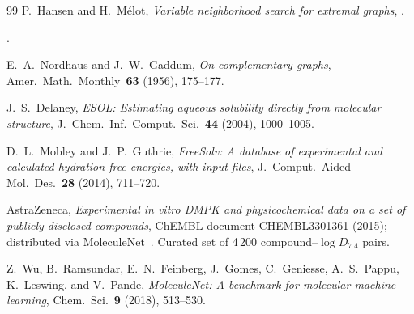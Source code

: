 \documentclass[11pt,a4paper]{article}
\theoremstyle{definition}
\newcommand{\todo}[1]{}
\begin{document}
\begin{thebibliography}{99}
P.~Hansen and H.~M\'elot,
\emph{Variable neighborhood search for extremal graphs},
\todo{[FULL CITATION REFERENCE NEEDED]}.

\todo{[BICYCLIC EXTREMAL REFERENCE NEEDED]}.

E.~A.~Nordhaus and J.~W.~Gaddum,
\emph{On complementary graphs},
Amer.~Math.~Monthly~\textbf{63} (1956), 175--177.

J.~S.~Delaney,
\emph{ESOL: Estimating aqueous solubility directly from molecular structure},
J.~Chem.~Inf.~Comput.~Sci.~\textbf{44} (2004), 1000--1005.

D.~L.~Mobley and J.~P.~Guthrie,
\emph{FreeSolv: A database of experimental and calculated hydration
free energies, with input files},
J.~Comput.~Aided Mol.~Des.~\textbf{28} (2014), 711--720.

AstraZeneca, \emph{Experimental in vitro DMPK and physicochemical data
on a set of publicly disclosed compounds},
ChEMBL document CHEMBL3301361 (2015);
distributed via MoleculeNet~\cite{MoleculeNet}. Curated set of
4\,200 compound--$\log D_{7.4}$ pairs.

Z.~Wu, B.~Ramsundar, E.~N.~Feinberg, J.~Gomes, C.~Geniesse,
A.~S.~Pappu, K.~Leswing, and V.~Pande,
\emph{MoleculeNet: A benchmark for molecular machine learning},
Chem.~Sci.~\textbf{9} (2018), 513--530.

\end{thebibliography}
\end{document}
